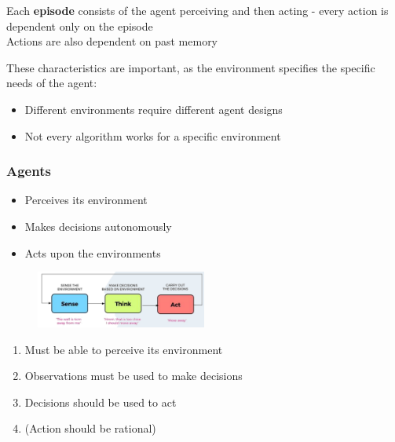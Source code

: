 \documentclass[
../../EiKI_Summary.tex,
]
{subfiles}
\begin{document}
\begin{defbox}
     Each \textbf{episode} consists of the agent perceiving and then acting -  every action is dependent only on the episode\\
     Actions are also dependent on past memory
\end{defbox}

These characteristics are important, as the environment specifies the specific needs of the agent: 
\begin{itemize}
    \item Different environments require different agent designs
    \item Not every algorithm works for a specific environment
\end{itemize} 

\subsubsection{Agents}
\begin{itemize}
    \item {} Perceives its environment
    \item {} Makes decisions autonomously
    \item {} Acts upon the environments
\end{itemize}

\begin{figure}
    [htp]
    \centering
    \includegraphics[width=0.5\textwidth]{Pics/2/Agent.png}
\end{figure}

\begin{defbox}
    \begin{enumerate}
        \item Must be able to perceive its environment
        \item Observations must be used to make decisions
        \item Decisions should be used to act
        \item (Action should be rational)
    \end{enumerate}
\end{defbox}
\end{document}
